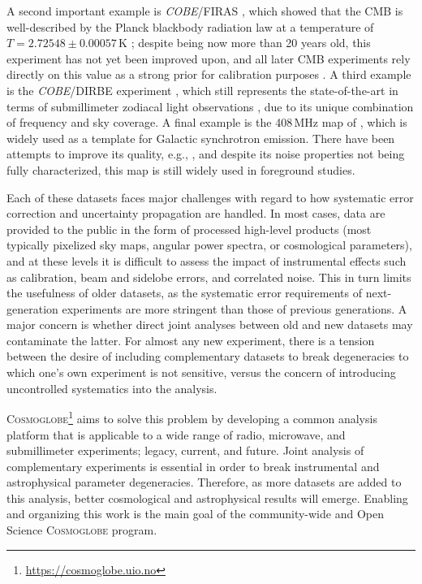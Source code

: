 \documentclass[twocolumn]{aa}
\newcommand{\cosmoglobe}{\textsc{Cosmoglobe}}
\begin{document}
A second important example is \textit{COBE}/FIRAS \citep{mather:1994}, which
showed that the CMB is well-described by the Planck blackbody radiation law at
a temperature of ${T=2.72548\pm0.00057\,\mathrm K}$ \citep{fixsen2009}; despite
being now more than 20 years old, this experiment has not yet been improved
upon, and all later CMB experiments rely directly on this value as a strong
prior for calibration purposes
\citep[e.g.,][]{bennett2012,planck2016-l05,bp07}. A third example is the
\textit{COBE}/DIRBE experiment \citep{hauser1998}, which still represents the
state-of-the-art in terms of submillimeter zodiacal light observations
\citep{kelsall1998,planck2013-pip88}, due to its unique combination of
frequency and sky coverage.  A final example is the 408\,MHz map of
\citet{haslam1982}, which is widely used as a template for Galactic synchrotron
emission. There have been attempts to improve its quality, e.g.,
\citet{remazeilles2014}, and despite its noise properties not being fully
characterized, this map is still widely used in foreground studies.

Each of these datasets faces major challenges with regard to how systematic
error correction and uncertainty propagation are handled.  In most cases, data
are provided to the public in the form of processed high-level products (most
typically pixelized sky maps, angular power spectra, or cosmological
parameters), and at these levels it is difficult to assess the impact of
instrumental effects such as calibration, beam and sidelobe errors, and
correlated noise. This in turn limits the usefulness of older datasets, as the
systematic error requirements of next-generation experiments are more stringent
than those of previous generations. A major concern is whether direct joint
analyses between old and new datasets may contaminate the latter. For almost
any new experiment, there is a tension between the desire of including
complementary datasets to break degeneracies to which one's own experiment is
not sensitive, versus the concern of introducing uncontrolled systematics into
the analysis.

\cosmoglobe\footnote{\url{https://cosmoglobe.uio.no}} aims to solve this problem by developing a common analysis platform
that is applicable to a wide range of radio, microwave, and submillimeter
experiments; legacy, current, and future. Joint analysis
of complementary experiments is essential in order to break
instrumental and astrophysical parameter degeneracies.  Therefore, as
more datasets are added to this analysis, better cosmological and
astrophysical results will emerge. Enabling and organizing this
work is the main goal of the community-wide and Open Science
\textsc{Cosmoglobe} program.
\end{document}
